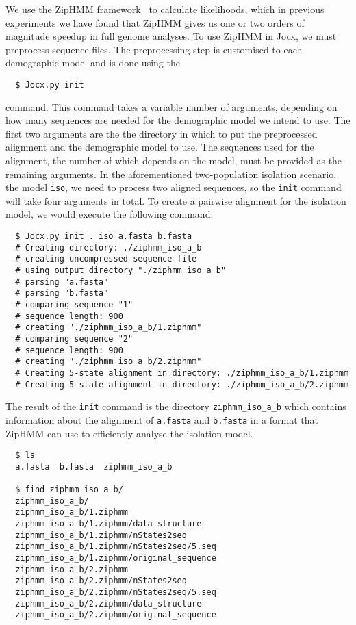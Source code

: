 \documentclass[graybox]{svmult}
\begin{document}
We use the ZipHMM framework~\cite{Sand:2013bia} to calculate likelihoods, which in previous experiments we have found that ZipHMM gives us one or two orders of magnitude speedup in full genome analyses. To use ZipHMM in Jocx, we must preprocess sequence files. The preprocessing step is customised to each demographic model and is done using the
{\small{}\begin{verbatim}
  $ Jocx.py init
\end{verbatim}}
command. This command takes a variable number of arguments, depending on how many sequences are needed for the demographic model we intend to use. The first two arguments are the the directory in which to put the preprocessed alignment and the demographic model to use. The sequences used for the alignment, the number of which depends on the model, must be provided as the remaining arguments. In the aforementioned two-population isolation scenario, the model \texttt{iso}, we need to process two aligned sequences, so the \texttt{init} command will take four arguments in total. To create a pairwise alignment for the isolation model, we would execute the following command:

{\small{}\begin{verbatim}
  $ Jocx.py init . iso a.fasta b.fasta
  # Creating directory: ./ziphmm_iso_a_b
  # creating uncompressed sequence file
  # using output directory "./ziphmm_iso_a_b"
  # parsing "a.fasta"
  # parsing "b.fasta"
  # comparing sequence "1"
  # sequence length: 900
  # creating "./ziphmm_iso_a_b/1.ziphmm"
  # comparing sequence "2"
  # sequence length: 900
  # creating "./ziphmm_iso_a_b/2.ziphmm"
  # Creating 5-state alignment in directory: ./ziphmm_iso_a_b/1.ziphmm
  # Creating 5-state alignment in directory: ./ziphmm_iso_a_b/2.ziphmm
\end{verbatim}}

The result of the \texttt{init} command is the directory \texttt{ziphmm\_iso\_a\_b} which contains information about the alignment of \texttt{a.fasta} and \texttt{b.fasta} in a format that ZipHMM can use to efficiently analyse the isolation model.

{\small{}\begin{verbatim}
  $ ls
  a.fasta  b.fasta  ziphmm_iso_a_b

  $ find ziphmm_iso_a_b/
  ziphmm_iso_a_b/
  ziphmm_iso_a_b/1.ziphmm
  ziphmm_iso_a_b/1.ziphmm/data_structure
  ziphmm_iso_a_b/1.ziphmm/nStates2seq
  ziphmm_iso_a_b/1.ziphmm/nStates2seq/5.seq
  ziphmm_iso_a_b/1.ziphmm/original_sequence
  ziphmm_iso_a_b/2.ziphmm
  ziphmm_iso_a_b/2.ziphmm/nStates2seq
  ziphmm_iso_a_b/2.ziphmm/nStates2seq/5.seq
  ziphmm_iso_a_b/2.ziphmm/data_structure
  ziphmm_iso_a_b/2.ziphmm/original_sequence
\end{verbatim}}
\end{document}

